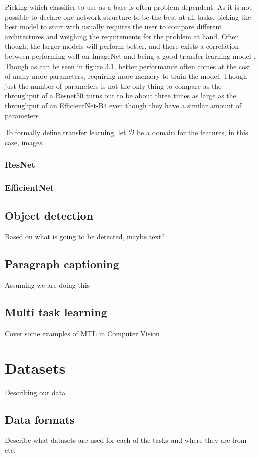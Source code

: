 Picking which classifier to use as a base is often problem-dependent. As it is not possible to declare one network structure to be the best at all tasks, picking the best model to start with usually requires the user to compare different architectures and weighing the requirements for the problem at hand. Often though, the larger models will perform better, and there exists a correlation between performing well on ImageNet and being a good transfer learning model \citep{betterTransfer}. Though as can be seen in figure 3.1, better performance often comes at the cost of many more parameters, requiring more memory to train the model. Though just the number of parameters is not the only thing to compare as the throughput of a Resnet50 turns out to be about three times as large as the throughput of an EfficientNet-B4 even though they have a similar amount of parameters \citep{classifierPerformance}.

To formally define transfer learning, let $\mathcal{D}$ be a domain for the features, in this case, images.
\subsection{ResNet}
\subsection{EfficientNet}
\section{Object detection}
Based on what is going to be detected, maybe text?
\section{Paragraph captioning}
Assuming we are doing this
\section{Multi task learning}
Cover some examples of MTL in Computer Vision

\chapter{Datasets}
Describing our data
\section{Data formats}
Describe what datasets are used for each of the tasks and where they are from etc.

